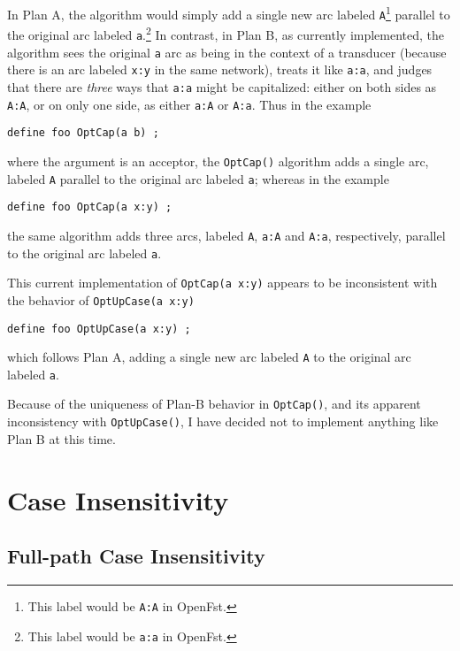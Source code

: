 \documentclass[letterpaper,12pt]{article}
\begin{document}
\noindent 
In Plan A, the algorithm would simply add a single new arc labeled
\texttt{A}\footnote{This label would be \texttt{A:A} in OpenFst.} parallel to
the original arc labeled \texttt{a}.\footnote{This label would be \texttt{a:a}
in OpenFst.}  In contrast, in Plan B, as currently implemented, the algorithm
sees the original \texttt{a} arc as being in the context of a transducer
(because there is an arc labeled \texttt{x:y} in the same network), treats it
like \texttt{a:a}, and judges that there are \emph{three} ways that \texttt{a:a}
might be capitalized: either on both sides as \texttt{A:A}, or on only one
side, as either \texttt{a:A} or \texttt{A:a}.  Thus in the example

\begin{Verbatim}[fontsize=\small]
define foo OptCap(a b) ;
\end{Verbatim}

\noindent
where the argument is an acceptor, the \verb!OptCap()! algorithm
adds a single arc, labeled \texttt{A} parallel to the original arc labeled
\texttt{a}; whereas in the example

\begin{Verbatim}[fontsize=\small]
define foo OptCap(a x:y) ;
\end{Verbatim}

\noindent
the same algorithm adds three arcs, labeled \texttt{A}, \texttt{a:A}
and \texttt{A:a}, respectively, parallel to the original arc labeled \texttt{a}.

This current implementation of \texttt{OptCap(a x:y)} appears to be
inconsistent with the behavior of \texttt{OptUpCase(a x:y)}

\begin{Verbatim}[fontsize=\small]
define foo OptUpCase(a x:y) ;
\end{Verbatim}

\noindent
which follows Plan A, adding a single new arc labeled \texttt{A} to the
original arc labeled \texttt{a}.

Because of the uniqueness of Plan-B behavior in \texttt{OptCap()}, and its
apparent inconsistency with \texttt{OptUpCase()}, I have decided not to
implement anything like Plan B at this time.

\section{Case Insensitivity}

\subsection{Full-path Case Insensitivity}
\end{document}
